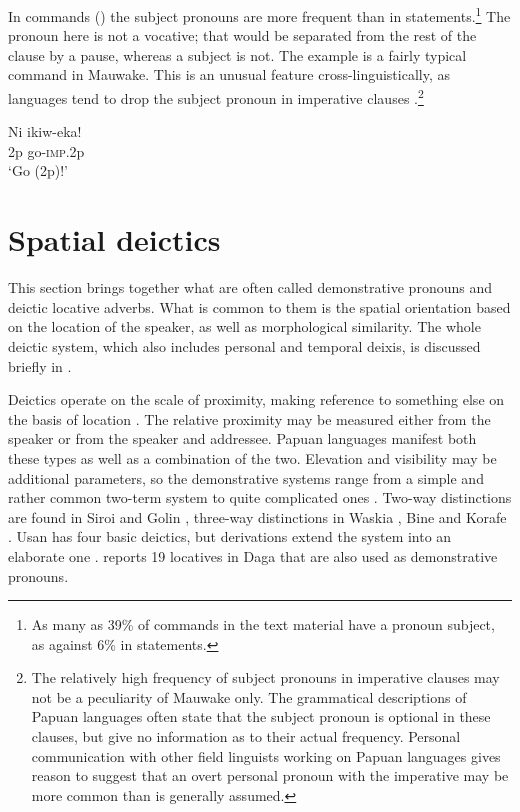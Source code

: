 In commands () the subject pronouns are more frequent than in statements.\footnote{As many as 39\% of commands in the text material have a pronoun subject, as against 6\% in statements.} The pronoun here is not a vocative; that would be separated from the rest of the clause by a pause, whereas a subject is not. The example  is a fairly typical command in Mauwake. This is an unusual feature cross-linguistically, as languages tend to drop the subject pronoun in imperative clauses \citep[80]{Givon1979}.\footnote{The relatively high frequency of subject pronouns in imperative clauses may not be a peculiarity of Mauwake only. The grammatical descriptions of Papuan languages often state that the subject pronoun is optional in these clauses, but give no information as to their actual frequency. Personal communication with other field linguists working on Papuan languages gives reason to suggest that an overt personal pronoun with the imperative may be more common than is generally assumed.} 

\ea%
\label{ex:3:x685}
\gll Ni ikiw-eka! \\
2p go-\textsc{imp}.2p\\
\glt`Go (2p)!'
\z


\section{Spatial deictics}\label{sec:3:6}
{}
This section brings together what are often called demonstrative pronouns and deictic locative adverbs. What is common to them is the spatial orientation based on the location of the speaker, as well as morphological similarity. The whole deictic system, which also includes personal and temporal deixis, is discussed briefly in . 

Deictics operate on the scale of proximity, making reference to something else on the basis of location \citep[57--58]{HallidayEtAl1976}. The relative proximity may be measured either from the speaker or from the speaker and addressee. Papuan languages manifest both these types as well as a combination of the two. Elevation and visibility may be additional parameters, so the demonstrative systems range from a simple and rather common two-term system to quite complicated ones \citep[75--77]{Foley1986}. Two-way distinctions are found in Siroi \citep[20]{Wells1979} and Golin \citep{Bunn1974}, three-way distinctions in Waskia \citep[59]{RossEtAl1978}%
, Bine \citep{Saari1985} and Korafe \citep[65]{FarrEtAl1982}%
. Usan has four basic deictics, but derivations extend the system into an elaborate one \citep[76--81]{Reesink1987}. \citet[38--39]{Murane1974} reports 19 locatives in Daga that are also used as demonstrative pronouns. 

